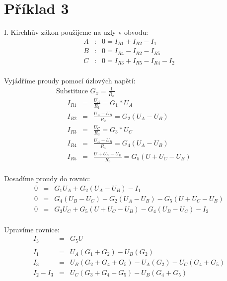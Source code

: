 \section{Příklad 3}

I. Kirchhův zákon použijeme na uzly v obvodu:
    \begin{eqnarray*}
        A&: & 0 = I_{R1} + I_{R2} - I_{1}\\
        B&: & 0 = I_{R4} -I_{R2} - I_{R5}\\
        C&: & 0 = I_{R3} + I_{R5} -I_{R4} - I_{2}\\
	\end{eqnarray*}

Vyjádříme proudy pomocí úzlových napětí:\\
    
               Substituce $G_{x} = \frac{1}{R_{x}}$
    \begin{eqnarray*}
        I_{R1} &= & \frac{U_{A}}{R_{1}} = G_{1} * U_{A}\\
        I_{R2} &= & \frac{U_{A} - U_{B}}{R_{2}} = G_{2}(U_{A} - U_{B})\\
        I_{R3} &= & \frac{U_{C}}{R_{3}} = G_{3} * U_{C}\\
        I_{R4} &= & \frac{U_{A} - U_{B}}{R_{4}} = G_{4}(U_{A} - U_{B})\\
        I_{R5} &= & \frac{U + U_{C} - U_{B}}{R_{5}} = G_{5}(U + U_{C} - U_{B})\\
	\end{eqnarray*}

Dosadíme proudy do rovnic:
    \begin{eqnarray*}
        0 &= & G_{1}U_{A} + G_{2}(U_{A} - U_{B}) - I_{1}\\
        0 &= & G_{4}(U_{B} - U_{C}) - G_{2}(U_{A} - U_{B}) - G_{5}(U + U_{C} - U_{B})\\
        0 &= & G_{3}U_{C} + G_{5}(U + U_{C} - U_{B}) - G_{4}(U_{B} - U_{C}) - I_{2}\\
	\end{eqnarray*}
	
Upravíme rovnice:
    \begin{eqnarray*}
        I_{3} &= & G_{5}U\\
        \\
        I_{1} &= & U_{A}(G_{1} + G_{2}) - U_{B}(G_{2})\\
        I_{3} &= & U_{B}(G_{2} + G_{4} + G_{5})-U_{A}(G_{2}) - U_{C}(G_{4} + G_{5})\\
        I_{2} - I_{3}&= & U_{C}(G_{3} + G_{4} + G_{5}) - U_{B}(G_{4} + G_{5})\\
	\end{eqnarray*}
	
